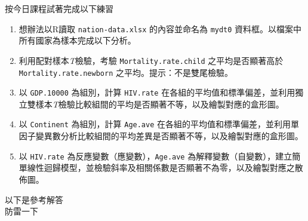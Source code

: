 \documentclass[14pt, aspectratio=43]{beamer}
\begin{document}
\begin{frame}[shrink=8, fragile]{按今日課程試著完成以下練習}
\begin{enumerate}
\item 想辦法以R讀取 \verb+nation-data.xlsx+ 的內容並命名為 \verb+mydt0+ 資料框。以檔案中所有國家為樣本完成以下分析。
\item 利用配對樣本\emph{T}檢驗，考驗 \verb+Mortality.rate.child+ 之平均是否顯著高於 \verb+Mortality.rate.newborn+ 之平均。提示：不是雙尾檢驗。
\item 以 \verb+GDP.10000+ 為組別，計算 \verb+HIV.rate+ 在各組的平均值和標準偏差，並利用獨立雙樣本\emph{T}檢驗比較組間的平均是否顯著不等，以及繪製對應的盒形圖。
\item 以 \verb+Continent+ 為組別，計算 \verb+Age.ave+ 在各組的平均值和標準偏差，並利用單因子變異數分析比較組間的平均差異是否顯著不等，以及繪製對應的盒形圖。
\item 以 \verb+HIV.rate+ 為反應變數（應變數），\verb+Age.ave+ 為解釋變數（自變數），建立簡單線性迴歸模型，並檢驗斜率及相關係數是否顯著不為零，以及繪製對應之散佈圖。
\end{enumerate}
\end{frame}

\begin{frame}{ }
\begin{center}
{\Huge 以下是參考解答\\ \normalsize 防雷一下}
\end{center}
\end{frame}
\end{document}
